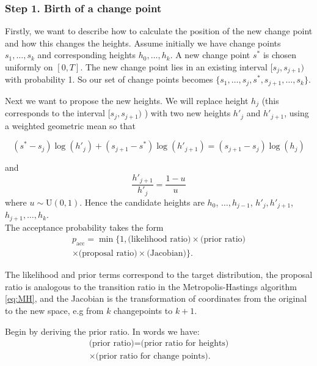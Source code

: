 \documentclass[../main.tex]{subfiles}
\begin{document}
    \subsubsection{Step 1. Birth of a change point}
Firstly, we want to describe how to calculate the position of the new change point and how this changes the heights. Assume initially we have change points $s_1, \dots, s_k$ and corresponding heights $h_0, \dots, h_k$.  A new change point $s^*$ is chosen uniformly on $[0,T]$. The new change point lies in an existing interval $[s_j,s_{j+1})$ with probability 1.  So our set of change points becomes $\{s_1 , \dots, s_j, s^*, s_{j+1}, \dots, s_k \}$. 

Next we want to propose the new heights. We will replace height $h_j$ (this corresponds to the interval $[s_j,s_{j+1})$ ) with two new heights $h'_j$ and $h'_{j+1}$, using a weighted geometric mean so that

\begin{equation}\label{eq:propose1}
(s^* - s_j) \log (h'_j) + (s_{j+1} - s^*) \log (h'_{j+1}) = (s_{j+1} - s_j ) \log (h_j)
\end{equation}

and
\begin{equation} \label{eq:propose2}
\frac{h'_{j+1}}{h'_j} = \frac{1-u}{u}
\end{equation}
where $u \sim \mathrm{U}(0,1)$. Hence the candidate heights are $h_0$, $\dots, h_{j-1}$, $h'_j, h'_{j+1}$, $h_{j+1}, \dots, h_k$.\\

The acceptance probability takes the form
\begin{multline}
p_{\mathrm{acc}} = \min \{1, \text{(likelihood ratio)} \times \text{(prior ratio)} \\  \times \text{(proposal ratio)} \times \text{(Jacobian)} \}.
\end{multline}

The likelihood and prior terms correspond to the target distribution, the proposal ratio is analogous to the transition ratio in the Metropolis-Hastings algorithm \eqref{eq:MH}, and the Jacobian is the transformation of coordinates from the original to the new space, e.g from $k$ changepoints to $k+1$. 

Begin by deriving the prior ratio. In words we have:
\begin{multline}
\text{(prior ratio)} = \text{(prior ratio for heights)} \\ \times \text{(prior ratio for change points)}.
\end{multline}
\end{document}
